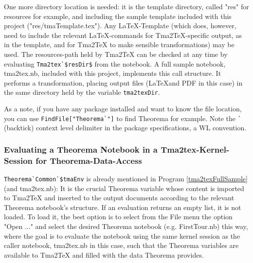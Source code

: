 One more directory location is needed: it is the template directory, called "res" for resources for example, and including the sample template included with this project ("res/tmaTemplate.tex"). Any \LaTeX-Template (which does, however, need to include the relevant \LaTeX-commands for Tma2TeX-specific output, as in the template, and for Tma2TeX to make sensible transformations) may be used. The resources-path held by Tma2TeX can be checked at any time by evaluating \lstinline+Tma2tex`$resDir$+ from the notebook. A full sample notebook, tma2tex.nb, included with this project, implements this call structure. It performs a transformation, placing output files (\LaTeX and PDF in this case) in the same directory held by the variable \lstinline+tma2texDir+.

As a note, if you have any package installed and want to know the file location, you can use \lstinline+FindFile["Theorema`"]+ to find Theorema for example. Note the \lstinline+`+ (backtick) context level delimiter in the package specifications, a WL convention.

\subsubsection{Evaluating a Theorema Notebook in a Tma2tex-Kernel-Session for Theorema-Data-Access}

\lstinline+Theorema`Common`$tmaEnv+ is already mentioned in Program \ref{tma2texFullSample} (and tma2tex.nb): It is the crucial Theorema variable whose content is imported to Tma2TeX and inserted to the output documents according to the relevant Theorema notebook's structure. If an evaluation returns an empty list, it is not loaded. To load it, the best option is to select from the File menu the option "Open ..." and select the desired Theorema notebook (e.g. FirstTour.nb) this way, where the goal is to evaluate the notebook using the same kernel session as the caller notebook, tma2tex.nb in this case, such that the Theorema variables are available to Tma2TeX and filled with the data Theorema provides.

